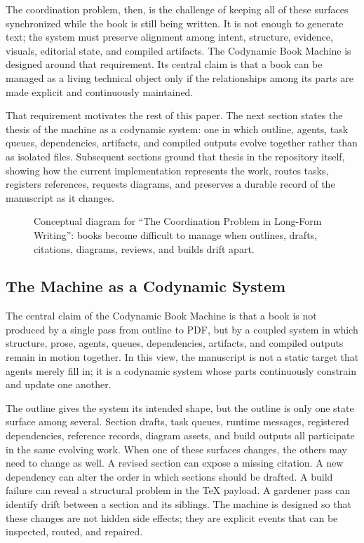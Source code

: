 \documentclass[11pt]{article}
\begin{document}
The coordination problem, then, is the challenge of keeping all of these surfaces synchronized while the book is still being written. It is not enough to generate text; the system must preserve alignment among intent, structure, evidence, visuals, editorial state, and compiled artifacts. The Codynamic Book Machine is designed around that requirement. Its central claim is that a book can be managed as a living technical object only if the relationships among its parts are made explicit and continuously maintained.

That requirement motivates the rest of this paper. The next section states the thesis of the machine as a codynamic system: one in which outline, agents, task queues, dependencies, artifacts, and compiled outputs evolve together rather than as isolated files. Subsequent sections ground that thesis in the repository itself, showing how the current implementation represents the work, routes tasks, registers references, requests diagrams, and preserves a durable record of the manuscript as it changes.

\begin{figure}[htbp]
\centering

\caption{Conceptual diagram for ``The Coordination Problem in Long-Form Writing'': books become difficult to manage when outlines, drafts, citations, diagrams, reviews, and builds drift apart.}
\end{figure}



\subsection{The Machine as a Codynamic System}


The central claim of the Codynamic Book Machine is that a book is not produced by a single pass from outline to PDF, but by a coupled system in which structure, prose, agents, queues, dependencies, artifacts, and compiled outputs remain in motion together. In this view, the manuscript is not a static target that agents merely fill in; it is a codynamic system whose parts continuously constrain and update one another.

The outline gives the system its intended shape, but the outline is only one state surface among several. Section drafts, task queues, runtime messages, registered dependencies, reference records, diagram assets, and build outputs all participate in the same evolving work. When one of these surfaces changes, the others may need to change as well. A revised section can expose a missing citation. A new dependency can alter the order in which sections should be drafted. A build failure can reveal a structural problem in the TeX payload. A gardener pass can identify drift between a section and its siblings. The machine is designed so that these changes are not hidden side effects; they are explicit events that can be inspected, routed, and repaired.
\end{document}
